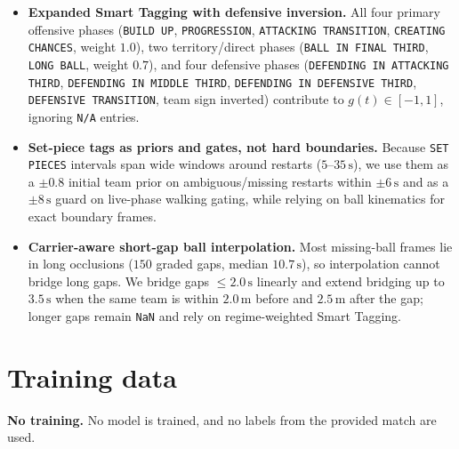 \documentclass[11pt,a4paper]{article}
\newcommand{\code}[1]{\texttt{#1}}
\begin{document}
\begin{itemize}
  \item \textbf{Expanded Smart Tagging with defensive inversion.} All four primary offensive phases
        (\code{BUILD UP}, \code{PROGRESSION}, \code{ATTACKING TRANSITION}, \code{CREATING CHANCES},
        weight $1.0$), two territory/direct phases (\code{BALL IN FINAL THIRD}, \code{LONG BALL},
        weight $0.7$), and four defensive phases (\code{DEFENDING IN ATTACKING THIRD},
        \code{DEFENDING IN MIDDLE THIRD}, \code{DEFENDING IN DEFENSIVE THIRD},
        \code{DEFENSIVE TRANSITION}, team sign inverted) contribute to $g(t) \in [-1, 1]$,
        ignoring \code{N/A} entries.
  \item \textbf{Set-piece tags as priors and gates, not hard boundaries.} Because \code{SET PIECES}
        intervals span wide windows around restarts ($5$--$35\,\text{s}$), we use them as a
        $\pm 0.8$ initial team prior on ambiguous/missing restarts within $\pm 6\,\text{s}$ and as a
        $\pm 8\,\text{s}$ guard on live-phase walking gating, while relying on ball kinematics for
        exact boundary frames.
  \item \textbf{Carrier-aware short-gap ball interpolation.} Most missing-ball frames lie in long
        occlusions ($150$ graded gaps, median $10.7\,\text{s}$), so interpolation cannot bridge
        long gaps. We bridge gaps $\le 2.0\,\text{s}$ linearly and extend bridging up to
        $3.5\,\text{s}$ when the same team is within $2.0\,\text{m}$ before and $2.5\,\text{m}$
        after the gap; longer gaps remain \code{NaN} and rely on regime-weighted Smart Tagging.
\end{itemize}

\section{Training data}

\textbf{No training.} No model is trained, and no labels from the provided match are used.
\end{document}
